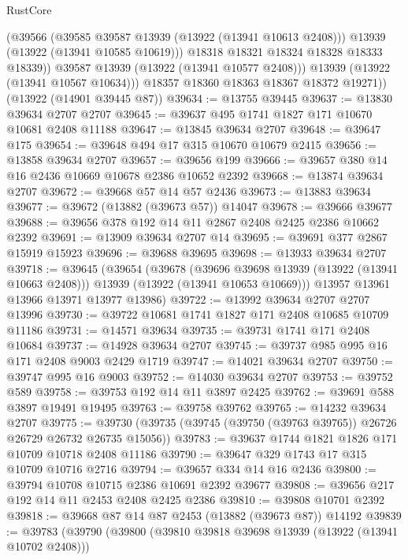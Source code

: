 \begin{lexlean}{RustCore}
\begin{coremodule}
                (@39566
                  (@39585 @39587 @13939 (@13922 (@13941 @10613 @2408)))
                  @13939
                  (@13922 (@13941 @10585 @10619)))
                @18318
                @18321
                @18324
                @18328
                @18333
                @18339))
            @39587
            @13939
            (@13922 (@13941 @10577 @2408)))
          @13939
          (@13922 (@13941 @10567 @10634)))
        @18357
        @18360
        @18363
        @18367
        @18372
        @19271))
    (@13922 (@14901 @39445 @87))
@39634 := @13755 @39445
@39637 := @13830 @39634 @2707 @2707
@39645 := @39637 @495 @1741 @1827 @171 @10670 @10681 @2408 @11188
@39647 := @13845 @39634 @2707
@39648 := @39647 @175
@39654 := @39648 @494 @17 @315 @10670 @10679 @2415
@39656 := @13858 @39634 @2707
@39657 := @39656 @199
@39666 := @39657 @380 @14 @16 @2436 @10669 @10678 @2386 @10652 @2392
@39668 := @13874 @39634 @2707
@39672 := @39668 @57 @14 @57 @2436
@39673 := @13883 @39634
@39677 := @39672 (@13882 (@39673 @57)) @14047
@39678 := @39666 @39677
@39688 := @39656 @378 @192 @14 @11 @2867 @2408 @2425 @2386 @10662 @2392
@39691 := @13909 @39634 @2707 @14
@39695 := @39691 @377 @2867 @15919 @15923
@39696 := @39688 @39695
@39698 := @13933 @39634 @2707
@39718 := @39645
    (@39654
      (@39678
        (@39696 @39698 @13939 (@13922 (@13941 @10663 @2408)))
        @13939
        (@13922 (@13941 @10653 @10669)))
      @13957
      @13961
      @13966
      @13971
      @13977
      @13986)
@39722 := @13992 @39634 @2707 @2707 @13996
@39730 := @39722 @10681 @1741 @1827 @171 @2408 @10685 @10709 @11186
@39731 := @14571 @39634
@39735 := @39731 @1741 @171 @2408 @10684
@39737 := @14928 @39634 @2707
@39745 := @39737 @985 @995 @16 @171 @2408 @9003 @2429 @1719
@39747 := @14021 @39634 @2707
@39750 := @39747 @995 @16 @9003
@39752 := @14030 @39634 @2707
@39753 := @39752 @589
@39758 := @39753 @192 @14 @11 @3897 @2425
@39762 := @39691 @588 @3897 @19491 @19495
@39763 := @39758 @39762
@39765 := @14232 @39634 @2707
@39775 := @39730 (@39735 (@39745 (@39750 (@39763 @39765)) @26726 @26729 @26732 @26735 @15056))
@39783 := @39637 @1744 @1821 @1826 @171 @10709 @10718 @2408 @11186
@39790 := @39647 @329 @1743 @17 @315 @10709 @10716 @2716
@39794 := @39657 @334 @14 @16 @2436
@39800 := @39794 @10708 @10715 @2386 @10691 @2392 @39677
@39808 := @39656 @217 @192 @14 @11 @2453 @2408 @2425 @2386
@39810 := @39808 @10701 @2392
@39818 := @39668 @87 @14 @87 @2453 (@13882 (@39673 @87)) @14192
@39839 := @39783
    (@39790
      (@39800
        (@39810 @39818 @39698 @13939 (@13922 (@13941 @10702 @2408)))

\end{coremodule}
\end{lexlean}
